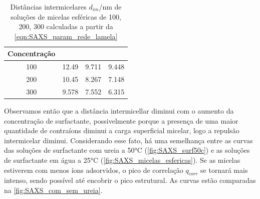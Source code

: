 	
		\begin{table}[h]
		\IBGEtab%
		{\caption{Distâncias intermicelares \(d_{im}\)/nm de soluções de micelas esféricas de \CTDTAB{} 100, 200, 300 \mM{} calculadas a partir da \autoref{eqn:SAXS_param_rede_lamela}}
			\label{tab:SAXS_dim}}%
		{\begin{tabular}{c c c c}
			\toprule
			Concentração & \CTAB  & \TTAB & \DTAB  \\ \midrule
			    100      & 12.49 & 9.711 & 9.448 \\
			    200      & 10.45 & 8.267 & 7.148 \\
			    300      & 9.578 & 7.552 & 6.315 \\ \bottomrule
		\end{tabular}}%
		{}
	\end{table}
	
	Observamos então que a distância intermicellar diminui com o aumento da concentração de surfactante, possivelmente porque a presença de uma maior quantidade de contraíons diminui a carga superficial micelar, logo a repulsão intermicelar diminui. Considerando esse fato, há uma semelhança entre as curvas das soluções de surfactante com ureia a 50°C (\autoref{fig:SAXS_surf50c}) e as soluções de surfactante em água a 25°C (\autoref{fig:SAXS_micelas_esfericas}). Se as micelas estiverem com menos íons adsorvidos, o pico de correlação \(q_{corr}\) se tornará mais intenso, sendo possível até encobrir o pico estrutural. As curvas estão comparadas na \autoref{fig:SAXS_com_sem_ureia}.

